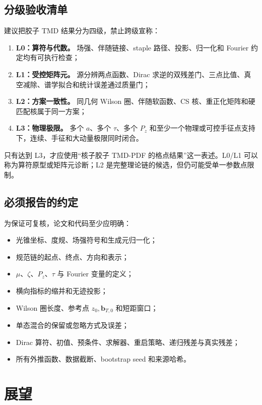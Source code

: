 \documentclass[UTF8,12pt,a4paper,twoside,openany]{ctexbook}
\newcommand{\Pz}{P_z}
\begin{document}
\section{分级验收清单}


建议把胶子 TMD 结果分为四级，禁止跨级宣称：
\begin{enumerate}
  \item \textbf{L0：算符与代数。} 场强、伴随链接、staple 路径、投影、归一化和 Fourier 约定均有可执行检查；
  \item \textbf{L1：受控矩阵元。} 源分辨两点函数、Dirac 求逆的双残差门、三点比值、真空减除、谱学拟合和统计误差通过质量门；
  \item \textbf{L2：方案一致性。} 同几何 Wilson 圈、伴随软函数、CS 核、重正化矩阵和硬匹配核属于同一方案；
  \item \textbf{L3：物理极限。} 多个 \(a\)、多个 \(\tau\)、多个 \(P_z\) 和至少一个物理或可控手征点支持下，连续、手征和大动量极限同时闭合。
\end{enumerate}
只有达到 L3，才应使用“核子胶子 TMD-PDF 的格点结果”这一表述。L0/L1 可以称为算符原型或矩阵元诊断；L2 是完整理论链的候选，但仍可能受单一参数点限制。

\section{必须报告的约定}

为保证可复核，论文和代码至少应明确：
\begin{itemize}
  \item 光锥坐标、度规、场强符号和生成元归一化；
  \item 规范链的起点、终点、方向和表示；
  \item \(\mu\)、\(\zeta\)、\(\Pz\)、\(\tau\) 与 Fourier 变量的定义；
  \item 横向指标的缩并和无迹投影；
  \item Wilson 圈长度、参考点 \(z_0,\boldsymbol b_{T,0}\) 和短距窗口；
  \item 单态混合的保留或忽略方式及误差；
  \item Dirac 算符、初值、预条件、求解器、重启策略、递归残差与真实残差；
  \item 所有外推函数、数据截断、bootstrap seed 和来源哈希。
\end{itemize}

\clearpage
\chapter{展望}
\end{document}
